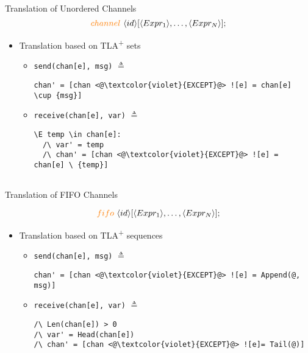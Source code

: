\documentclass{beamer}
\newcommand{\tlaplus}{TLA\textsuperscript{+}\xspace}
\newcommand{\entity}[1]{\ensuremath{\langle}#1\ensuremath{\rangle}}
\begin{document}
\begin{frame}[fragile]{Translation of Unordered Channels}
        \[
            \textcolor{orange}{channel}\ \entity{id}[\entity{Expr_1},\dots,\entity{Expr_N}];
        \]
    \begin{itemize}

     \item Translation based on \tlaplus sets
     \newline
        \begin{itemize}
            \item \verb|send(chan[e], msg)| $\triangleq$
            \begin{lstlisting}[language=pluscal, frame = none, numbers = none]
chan' = [chan <@\textcolor{violet}{EXCEPT}@> ![e] = chan[e] \cup {msg}]
\end{lstlisting}
            \newline
            \item \verb|receive(chan[e], var)| $\triangleq$            \begin{lstlisting}[language=pluscal, frame = none, numbers = none]
\E temp \in chan[e]:
  /\ var' = temp
  /\ chan' = [chan <@\textcolor{violet}{EXCEPT}@> ![e] = chan[e] \ {temp}]
                    
\end{lstlisting}
\end{itemize}

    \end{itemize}
\end{frame}

\begin{frame}[fragile]{Translation of FIFO Channels}

        \[
            \textcolor{orange}{fifo}\ \entity{id}[\entity{Expr_1},\dots,\entity{Expr_N}];
        \]
    \begin{itemize}    
     \item Translation based on \tlaplus sequences
     \newline
            \begin{itemize}
                \item \verb|send(chan[e], msg)| $\triangleq$
                \begin{lstlisting}[language=pluscal, frame = none, numbers = none]
chan' = [chan <@\textcolor{violet}{EXCEPT}@> ![e] = Append(@, msg)]
                \end{lstlisting}
                \item \verb|receive(chan[e], var)| $\triangleq$
                \begin{lstlisting}[language=pluscal, frame = none, numbers = none]
/\ Len(chan[e]) > 0
/\ var' = Head(chan[e])
/\ chan' = [chan <@\textcolor{violet}{EXCEPT}@> ![e]= Tail(@)]
                    
\end{lstlisting}
                     
            \end{itemize}
    \end{itemize}
\end{frame}
\end{document}
